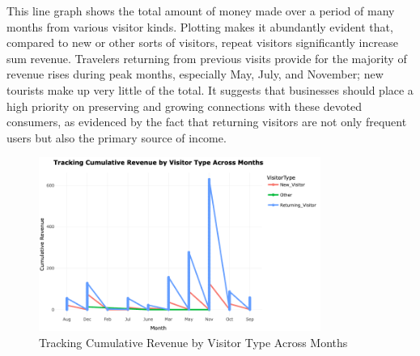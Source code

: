 \documentclass[12pt]{article}
\begin{document}
\FloatBarrier
This line graph shows the total amount of money made over a period of many months from various visitor kinds. Plotting makes it abundantly evident that, compared to new or other sorts of visitors, repeat visitors significantly increase sum revenue. Travelers returning from previous visits provide for the majority of revenue rises during peak months, especially May, July, and November; new tourists make up very little of the total. It suggests that businesses should place a high priority on preserving and growing connections with these devoted consumers, as evidenced by the fact that returning visitors are not only frequent users but also the primary source of income.
\begin{figure}[h]
    \centering
    \includegraphics[width=0.82\textwidth]{Tracking Cumulative Revenue by Visitor Type Across Months.png}  
    \caption{Tracking Cumulative Revenue by Visitor Type Across Months}
\end{figure}
\vspace{0.5cm}
\newpage

\FloatBarrier
\end{document}

